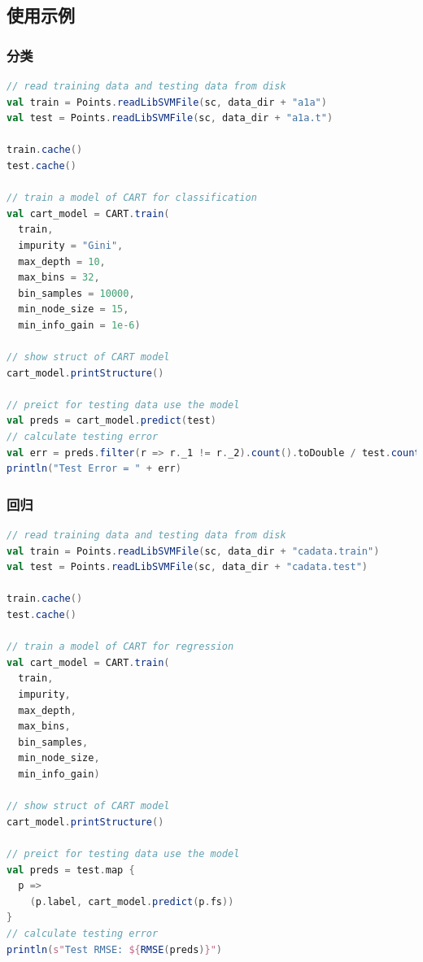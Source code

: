 \documentclass[a4paper,11pt,         %
               ]{article}
\begin{document}
\subsection{使用示例}

\subsubsection{分类}

\begin{lstlisting}[language={SCALA},title={RunCARTForClassificationDemo.scala}]  
// read training data and testing data from disk
val train = Points.readLibSVMFile(sc, data_dir + "a1a")
val test = Points.readLibSVMFile(sc, data_dir + "a1a.t")

train.cache()
test.cache()

// train a model of CART for classification
val cart_model = CART.train(
  train,
  impurity = "Gini",
  max_depth = 10,
  max_bins = 32,
  bin_samples = 10000,
  min_node_size = 15,
  min_info_gain = 1e-6)

// show struct of CART model
cart_model.printStructure()

// preict for testing data use the model
val preds = cart_model.predict(test)
// calculate testing error
val err = preds.filter(r => r._1 != r._2).count().toDouble / test.count()
println("Test Error = " + err)
\end{lstlisting}  

\subsubsection{回归}

\begin{lstlisting}[language={SCALA},title={RunCARTForRegressionDemo.scala}]  
// read training data and testing data from disk
val train = Points.readLibSVMFile(sc, data_dir + "cadata.train")
val test = Points.readLibSVMFile(sc, data_dir + "cadata.test")

train.cache()
test.cache()

// train a model of CART for regression
val cart_model = CART.train(
  train,
  impurity,
  max_depth,
  max_bins,
  bin_samples,
  min_node_size,
  min_info_gain)

// show struct of CART model
cart_model.printStructure()

// preict for testing data use the model
val preds = test.map {
  p =>
    (p.label, cart_model.predict(p.fs))
}
// calculate testing error
println(s"Test RMSE: ${RMSE(preds)}")
\end{lstlisting}  
\end{document}
